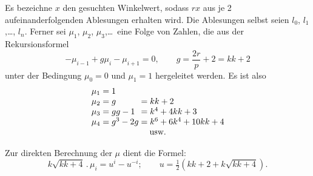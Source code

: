 \par\noindent\hspace*{\parindent}Es bezeichne $x$ den gesuchten Winkelwert, sodass $rx$ aus je 2 aufeinanderfolgenden Ablesungen erhalten wird. Die Ablesungen selbst seien $l_0$, $l_1$,\ldots, $l_n$. Ferner sei $\mu_1$, $\mu_2$, $\mu_3$,\ldots\ eine Folge von Zahlen, die aus der Rekursionsformel
\[
-\mu_{i-1}+g\mu_i-\mu_{i+1}=0,\qquad g=\frac{2r}p+2=kk+2
\]
\noindent unter der Bedingung $\mu_0=0$ und $\mu_1=1$ hergeleitet werden. Es ist also
\[
\begin{array}{r@{\;}c@{\;}l@{\;}c@{\;}l}
\mu_1&=&1&&\\
\mu_2&=&g&=&kk+2\\
\mu_3&=&gg-1&=&k^4+4kk+3\\
\mu_4&=&g^3-2g&=&k^6+6k^4+10kk+4\\
\multicolumn{5}{c}{\text{usw.}}
\end{array}
\]
\par\noindent\hspace*{\parindent}Zur direkten Berechnung der $\mu$ dient die Formel:
\[
k\sqrt{kk+4}\,.\,\mu_i=u^i-u^{-i};\qquad u=\tfrac12(kk+2+k\sqrt{kk+4}).
\]
\par\endgroup

